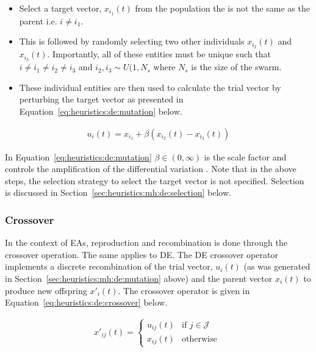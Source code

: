 \begin{itemize}
      \item Select a target vector, $x_{i_{1}}(t)$ from the population the is not the same as the parent i.e. $i \neq i_{1}$.
      \item This is followed by randomly selecting two other individuals $x_{i_{2}}(t)$ and $x_{i_{3}}(t)$. Importantly, all of these entities must be unique such that $i \neq i_{1} \neq i_{2} \neq i_{3}$ and $i_{2}, i_{3} \sim U(1, N_{s}$ where $N_{s}$ is the size of the swarm.
      \item These individual entities are then used to calculate the trial vector by perturbing the target vector as presented in Equation~\ref{eq:heuristics:de:mutation} below.
\end{itemize}


\begin{equation}
      \label{eq:heuristics:de:mutation}
      \begin{split}
            u_{i}(t) = x_{i_{1}} + \beta(x_{i_{2}}(t) - x_{i_{3}}(t))
      \end{split}
\end{equation}

In Equation~\ref{eq:heuristics:de:mutation} $\beta \in (0, \infty)$ is the scale factor and controls the amplification of the differential variation \cite{ref:engelbrecht:2007}. Note that in the above steps, the selection strategy to select the target vector is not specified. Selection is discussed in Section~\ref{sec:heuristics:mh:de:selection} below.


\subsubsection{Crossover}
\label{sec:heuristics:mh:de:crossover}

In the context of \acp{EA}, reproduction and recombination is done through the crossover operation. The same applies to \ac{DE}. The \ac{DE} crossover operator implements a discrete recombination of the trial vector, $u_{i}(t)$ (as was generated in Section~\ref{sec:heuristics:mh:de:mutation} above) and the parent vector $x_{i}(t)$ to produce new offspring $x'_{i}(t)$. The crossover operator is given in Equation~\ref{eq:heuristics:de:crossover} below.

\begin{equation}
      \label{eq:heuristics:de:crossover}
      \begin{split}
            x'_{ij}(t)=
            \begin{cases}
                  u_{ij}(t) & \text{if } j \in \mathcal{J} \\
                  x_{ij}(t) & \text{otherwise }
            \end{cases}
      \end{split}
\end{equation}

